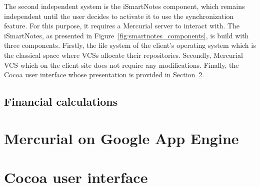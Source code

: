 The second independent system is the iSmartNotes component, which remains independent until the user decides to activate it to use the synchronization feature. For this purpose, it requires a Mercurial server to interact with. The iSmartNotes, as presented in Figure~\ref{fig:smartnotes_components}, is build with three components. Firstly, the file system of the client's operating system which is the classical space where VCSs allocate their repositories. Secondly, Mercurial VCS which on the client site does not require any modifications. Finally, the Cocoa user interface whose presentation is provided in Section~\ref{sec:cocoa}.

\subsection{Financial calculations}\label{subsec:gae_calculations}
\section{Mercurial on Google App Engine}\label{sec:hg_on_gae}
\section{Cocoa user interface}\label{sec:cocoa}